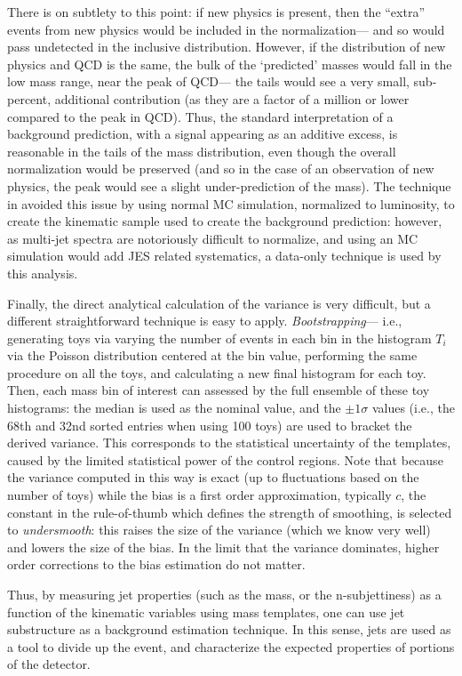 There is on subtlety to this point: if new physics is present, then the ``extra'' events from new physics would be included in the normalization--- and so would pass undetected in the inclusive distribution. However, if the \pt distribution of new physics and QCD is the same, the bulk of the `predicted' masses would fall in the low mass range, near the peak of QCD--- the tails would see a very small, sub-percent, additional contribution (as they are a factor of a million or lower compared to the peak in QCD). Thus, the standard interpretation of a background prediction, with a signal appearing as an additive excess, is reasonable in the tails of the mass distribution, even though the overall normalization would be preserved (and so in the case of an observation of new physics, the peak would see a slight under-prediction of the mass). The technique in \cite{MassTemplates} avoided this issue by using normal MC simulation, normalized to luminosity, to create the kinematic sample used to create the background prediction: however, as multi-jet \pt spectra are notoriously difficult to normalize, and using an MC simulation would add JES related systematics, a data-only technique is used by this analysis.

Finally, the direct analytical calculation of the variance is very difficult, but a different straightforward technique is easy to apply. \textit{Bootstrapping}--- i.e., generating toys via varying the number of events in each bin in the histogram $T_i$ via the Poisson distribution centered at the bin value, performing the same procedure on all the toys, and calculating a new final histogram for each toy. Then, each mass bin of interest can assessed by the full ensemble of these toy histograms: the median is used as the nominal value, and the $\pm 1\sigma$ values (i.e., the 68th and 32nd sorted entries when using 100 toys) are used to bracket the derived variance. This corresponds to the statistical uncertainty of the templates, caused by the limited statistical power of the control regions. Note that because the variance computed in this way is exact (up to fluctuations based on the number of toys) while the bias is a first order approximation, typically $c$, the constant in the rule-of-thumb which defines the strength of smoothing, is selected to \textit{undersmooth}: this raises the size of the variance (which we know very well) and lowers the size of the bias. In the limit that the variance dominates, higher order corrections to the bias estimation do not matter.

Thus, by measuring jet properties (such as the mass, or the n-subjettiness) as a function of the kinematic variables using mass templates, one can use jet substructure as a background estimation technique. In this sense, jets are used as a tool to divide up the event, and characterize the expected properties of portions of the detector.
%

